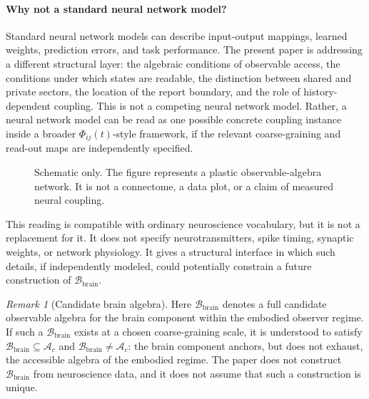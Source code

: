\documentclass[12pt]{article}
\theoremstyle{definition}
\theoremstyle{remark}
\newtheorem{remark}[proposition]{Remark}
\newcommand{\Ac}{\mathcal A_c}
\newcommand{\Bbrain}{\mathcal B_{\mathrm{brain}}}
\begin{document}
\paragraph{Why not a standard neural network model?}
Standard neural network models can describe input-output mappings,
learned weights, prediction errors, and task performance. The present
paper is addressing a different structural layer: the algebraic
conditions of observable access, the conditions under which states are
readable, the distinction between shared and private sectors, the
location of the report boundary, and the role of history-dependent
coupling. This is not a competing neural network model. Rather, a neural
network model can be read as one possible concrete coupling instance
inside a broader \(\Phi_{ij}(t)\)-style framework, if the relevant
coarse-graining and read-out maps are independently specified.

\begin{figure}[H]
\centering
{}
\caption{Schematic only. The figure represents a plastic
observable-algebra network. It is not a connectome, a data plot, or a
claim of measured neural coupling.}
\end{figure}

This reading is compatible with ordinary neuroscience vocabulary, but
it is not a replacement for it. It does not specify neurotransmitters,
spike timing, synaptic weights, or network physiology. It gives a
structural interface in which such details, if independently modeled,
could potentially constrain a future construction of \(\Bbrain\).

\begin{remark}[Candidate brain algebra]
Here \(\Bbrain\) denotes a full candidate observable algebra for the
brain component within the embodied observer regime. If such a
\(\Bbrain\) exists at a chosen coarse-graining scale, it is understood
to satisfy \(\Bbrain\subseteq\Ac\) and \(\Bbrain\neq\Ac\): the brain
component anchors, but does not exhaust, the accessible algebra of the
embodied regime. The paper does not construct \(\Bbrain\) from
neuroscience data, and it does not assume that such a construction is
unique.
\end{remark}
\end{document}
